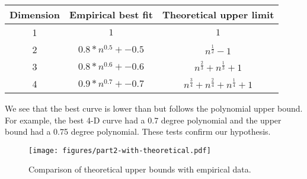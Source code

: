 \begin{tabular}{|c|c|c|}
\hline
Dimension&Empirical best fit&Theoretical upper limit\\
\hline
1&$1$&$1$\\
2&$0.8*n^{0.5} + -0.5$&$n^{\frac{1}{2}}-1$\\
3&$0.8*n^{0.6} + -0.6$&$n^{\frac{2}{3}} + n^{\frac{1}{3}} + 1$\\
4&$0.9*n^{0.7} + -0.7$&$n^{\frac{3}{4}} + n^{\frac{2}{4}} + n^{\frac{1}{4}} + 1$\\
\hline
\end{tabular}

We see that the best curve is lower than but follows the polynomial upper
bound. For example, the best 4-D curve had a 0.7 degree polynomial and the
upper bound had a 0.75 degree polynomial. These tests confirm our
hypothesis.

\begin{figure}[htb!]
\centering
\texttt{[image: figures/part2-with-theoretical.pdf]}
\caption{Comparison of theoretical upper bounds with empirical data.}
\label{fig:part2-with-theoretical}
\end{figure}

